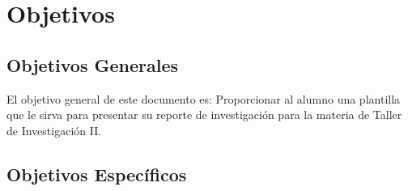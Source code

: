 \section{Objetivos}

    \subsection{Objetivos Generales}
    \label{subsec:objGrales}
    El objetivo general de este documento es:
    Proporcionar al alumno una plantilla que le sirva para presentar su reporte de investigación
    para la materia de Taller de Investigación II.
    
    \subsection{Objetivos Específicos}
